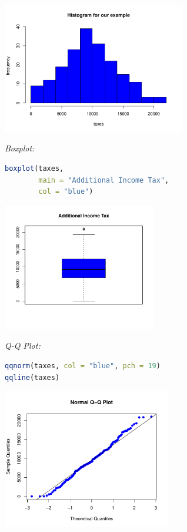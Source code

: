 \begin{example}
\begin{center}
\includegraphics[width=0.6\textwidth]{Section7/tax_histogram.pdf}
\end{center}

\textit{Boxplot:}

\begin{lstlisting}[language=R]
boxplot(taxes,
        main = "Additional Income Tax",
        col = "blue")
\end{lstlisting}

\begin{center}
\includegraphics[width=0.5\textwidth]{Section7/tax_boxplot.pdf}
\end{center}

\textit{Q-Q Plot:}

\begin{lstlisting}[language=R]
qqnorm(taxes, col = "blue", pch = 19)
qqline(taxes)
\end{lstlisting}

\begin{center}
\includegraphics[width=0.55\textwidth]{Section7/tax_qqplot.pdf}
\end{center}


\end{example}
